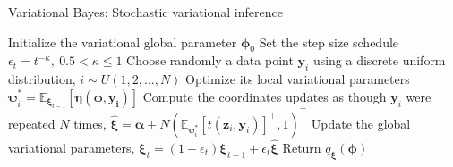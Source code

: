 \begin{algorithm}
	\caption{Variational Bayes: Stochastic variational inference}\label{VB1}
	\begin{algorithmic}[1]
		\State Initialize the variational global parameter $\boldsymbol{\phi}_0$
		\State Set the step size schedule $\epsilon_t=t^{-\kappa}, \ 0.5<\kappa\leq 1$
		\State Choose randomly a data point $\boldsymbol{y}_i$ using a discrete uniform distribution, $i\sim U(1,2,\dots,N)$
		\State Optimize its local variational parameters $\boldsymbol{\psi}_i^*=\mathbb{E}_{\boldsymbol{\xi}_{t-1}}[\boldsymbol{\eta(\boldsymbol{\phi},y_i)}]$
		\State Compute the coordinates updates as though $\boldsymbol{y}_i$ were repeated $N$ times, $\hat{\boldsymbol{\xi}}=\boldsymbol{\alpha}+N(\mathbb{E}_{\boldsymbol{\psi}_i^*}[t(\boldsymbol{z}_i,\boldsymbol{y}_i)]^{\top},1)^{\top}$
		\State Update the global variational parameters, $\boldsymbol{\xi}_t=(1-\epsilon_t)\boldsymbol{\xi}_{t-1}+\epsilon_t\hat{\boldsymbol{\xi}}$  
		\EndWhile 
		\State Return $q_{\boldsymbol{\xi}}(\boldsymbol{\phi})$ 
	\end{algorithmic}
\end{algorithm} 

